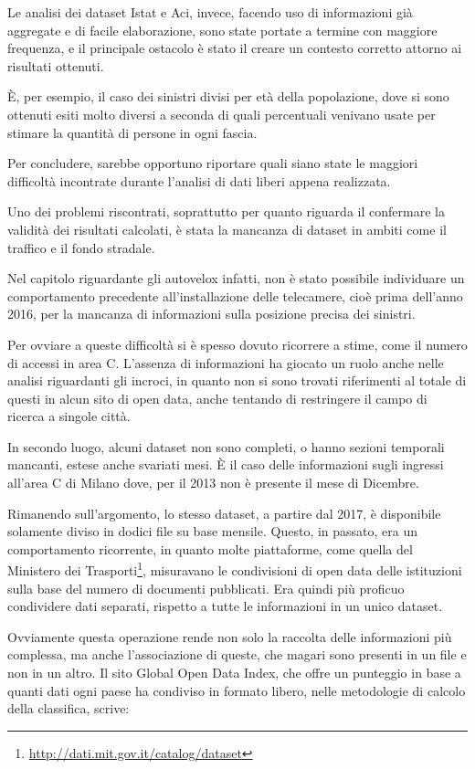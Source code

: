 \documentclass[a4paper,12pt]{report}
\newcommand{\skipline}{\vspace{0.2in}}
\begin{document}
Le analisi dei dataset Istat e Aci, invece, facendo uso di informazioni già aggregate 
e di facile elaborazione, sono state portate a termine con maggiore frequenza, e il 
principale ostacolo è stato il creare un contesto corretto attorno ai risultati ottenuti. 

\`E, per esempio, il caso dei sinistri divisi per età della popolazione, 
dove si sono ottenuti esiti 
molto diversi a seconda di quali percentuali venivano usate per stimare la quantità di 
persone in ogni fascia. 

\skipline
Per concludere, sarebbe opportuno riportare quali siano state le maggiori difficoltà 
incontrate durante l'analisi di dati liberi appena realizzata. 

Uno dei problemi riscontrati, soprattutto per quanto riguarda il confermare la 
validità dei risultati calcolati, è stata la mancanza di dataset in ambiti come 
il traffico e il fondo stradale. 

Nel capitolo riguardante gli autovelox infatti, non è stato possibile individuare 
un comportamento precedente all'installazione delle telecamere, cioè prima dell'anno 2016, 
per la mancanza di informazioni sulla posizione precisa dei sinistri. 

Per ovviare a queste difficoltà si è spesso dovuto ricorrere a stime, 
come il numero di accessi in area C. 
L'assenza di informazioni ha giocato un ruolo anche nelle analisi riguardanti gli incroci, 
in quanto non si sono trovati riferimenti al totale di questi in alcun sito di open data, 
anche tentando di restringere il campo di ricerca a singole città. 


In secondo luogo, alcuni dataset non sono completi, o hanno sezioni temporali mancanti,
estese anche svariati mesi. 
\`E il caso delle informazioni sugli ingressi all'area C di Milano dove, 
per il 2013 non è presente il mese di Dicembre. 

Rimanendo sull'argomento, lo stesso dataset, a partire dal 2017, è disponibile 
solamente diviso in dodici file su base mensile. 
Questo, in passato, era un comportamento ricorrente, in 
quanto molte piattaforme, come quella del Ministero dei 
Trasporti\footnote{\url{http://dati.mit.gov.it/catalog/dataset}}, 
misuravano le condivisioni di open data delle istituzioni 
sulla base del numero di documenti pubblicati. 
Era quindi più proficuo condividere dati separati, rispetto a tutte le informazioni in 
un unico dataset. 

Ovviamente questa operazione rende non solo la raccolta delle informazioni più complessa, 
ma anche l'associazione di queste, che magari sono presenti in un file e non in un altro. 
Il sito Global Open Data Index, che offre un punteggio in base a quanti dati ogni paese 
ha condiviso in formato libero, nelle metodologie di calcolo della classifica, scrive: 
\end{document}
